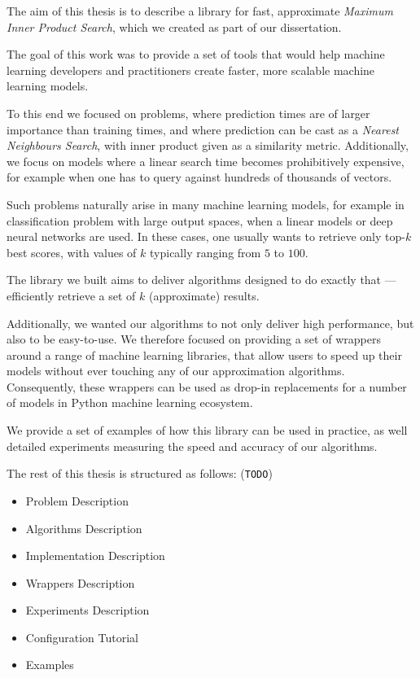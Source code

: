 The aim of this thesis is to describe a library for fast, approximate \textit{Maximum Inner Product Search},
which we created as part of our dissertation. 

The goal of this work was to provide a set of tools that would help machine learning developers and practitioners create faster, 
more scalable machine learning models.

To this end we focused on problems, where prediction times are of larger importance than training times, and where prediction can be 
cast as a \textit{Nearest Neighbours Search}, with inner product given as a similarity metric. Additionally, we focus
on models where a linear search time becomes prohibitively expensive, for example when one has to query against hundreds of thousands of vectors.

Such problems naturally arise in many machine learning models, for example in classification problem with large output spaces, 
when a linear models or deep neural networks are used. In these cases, one usually wants to retrieve only top-$k$ best scores, with values
of $k$ typically ranging from $5$ to $100$.

The library we built aims to deliver algorithms designed to do exactly that --- efficiently retrieve a set of $k$ (approximate) results.

Additionally, we wanted our algorithms to not only deliver high performance, but also to be easy-to-use. We therefore 
focused on providing a set of wrappers around a range of machine learning libraries, that allow users to 
speed up their models without ever touching any of our approximation algorithms. Consequently, these wrappers can be used as drop-in replacements for a number of models in Python machine learning ecosystem.

We provide a set of examples of how this library can be used in practice, as well detailed experiments measuring the speed and 
accuracy of our algorithms.

The rest of this thesis is structured as follows: (\texttt{TODO})
\begin{itemize}
    \setlength\itemsep{1pt}
    \item Problem Description
    \item Algorithms Description
    \item Implementation Description
    \item Wrappers Description
    \item Experiments Description
    \item Configuration Tutorial
    \item Examples
\end{itemize}

